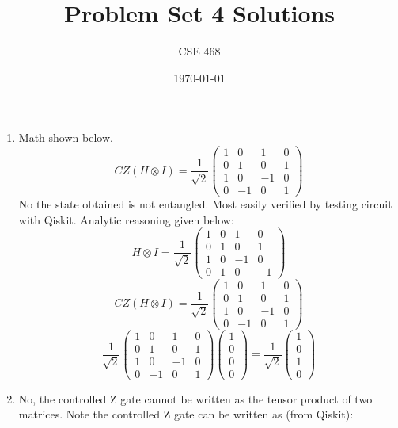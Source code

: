 \documentclass[12pt]{article}
\title{Problem Set 4 Solutions}
\author{CSE 468}
\date{\today}
\begin{document}
\maketitle

\begin{enumerate}[font=\bfseries]
    \item Math shown below.
    \[CZ(H \otimes I) = \frac{1}{\sqrt{2}}
    \begin{pmatrix}
    1 & 0 & 1 & 0 \\
    0 & 1 & 0 & 1 \\
    1 & 0 & -1 & 0 \\
    0 & -1 & 0 & 1
    \end{pmatrix}
    \]
    No the state obtained is not entangled. Most easily verified by testing circuit with Qiskit. Analytic reasoning given below:
    \[H \otimes I = \frac{1}{\sqrt{2}}\begin{pmatrix}
    1 & 0 & 1 & 0 \\
    0 & 1 & 0 & 1 \\
    1 & 0 & -1 & 0 \\
    0 & 1 & 0 & -1
    \end{pmatrix}\]
    \[CZ(H \otimes I) = \frac{1}{\sqrt{2}}
    \begin{pmatrix}
    1 & 0 & 1 & 0 \\
    0 & 1 & 0 & 1 \\
    1 & 0 & -1 & 0 \\
    0 & -1 & 0 & 1
    \end{pmatrix}
    \]
    \[\frac{1}{\sqrt{2}}
    \begin{pmatrix}
    1 & 0 & 1 & 0 \\
    0 & 1 & 0 & 1 \\
    1 & 0 & -1 & 0 \\
    0 & -1 & 0 & 1
    \end{pmatrix}
    \begin{pmatrix}
    1 \\ 0 \\ 0 \\ 0
    \end{pmatrix}
    =
    \frac{1}{\sqrt{2}}
    \begin{pmatrix}
    1 \\ 0 \\ 1 \\ 0
    \end{pmatrix}
    \]
    \item No, the controlled Z gate cannot be written as the tensor product of two matrices. Note the controlled Z gate can be written as (from Qiskit):

\end{enumerate}
\end{document}
